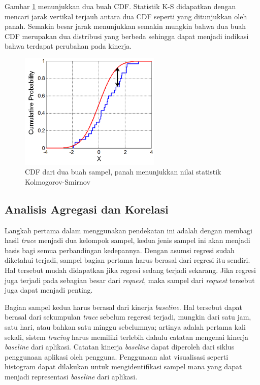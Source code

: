 Gambar \ref{ks-example} menunjukkan dua buah CDF. Statistik K-S didapatkan dengan mencari jarak vertikal terjauh antara dua CDF seperti yang ditunjukkan oleh panah. Semakin besar jarak menunjukkan semakin mungkin bahwa dua buah CDF merupakan dua distribusi yang berbeda sehingga dapat menjadi indikasi bahwa terdapat perubahan pada kinerja. 
\begin{figure}[htb]
	\centering
	\includegraphics[width=0.6\textwidth]{resources/ch2/ks.png}
	\caption{CDF dari dua buah sampel, panah menunjukkan nilai statistik Kolmogorov-Smirnov \citep{wiki:ks-test}}
	\label{ks-example}
\end{figure}

\subsection{Analisis Agregasi dan Korelasi}
\label{approach-corr}

Langkah pertama dalam menggunakan pendekatan ini adalah dengan membagi hasil \textit{trace} menjadi dua kelompok sampel, kedua jenis sampel ini akan menjadi basis bagi semua perbandingan kedepannya. Dengan asumsi regresi sudah diketahui terjadi, sampel bagian pertama harus berasal dari regresi itu sendiri. Hal tersebut mudah didapatkan jika regresi sedang terjadi sekarang. Jika regresi juga terjadi pada sebagian besar dari \textit{request}, maka sampel dari \textit{request} tersebut juga dapat menjadi penting. 

Bagian sampel kedua harus berasal dari kinerja \textit{baseline}. Hal tersebut dapat berasal dari sekumpulan \textit{trace} sebelum regeresi terjadi, mungkin dari satu jam, satu hari, atau bahkan satu minggu sebelumnya; artinya adalah pertama kali sekali, sistem \textit{tracing} harus memiliki terlebih dahulu catatan mengenai kinerja \textit{baseline} dari aplikasi. Catatan kinerja \textit{baseline} dapat diperoleh dari siklus penggunaan aplikasi oleh pengguna. Penggunaan alat visualisasi seperti histogram dapat dilakukan untuk mengidentifikasi sampel mana yang dapat menjadi representasi \textit{baseline} dari aplikasi.

